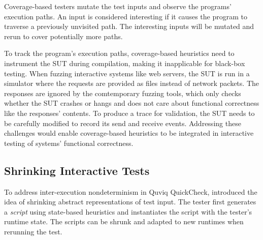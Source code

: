 Coverage-based testers mutate the test inputs and observe the programs'
execution paths.  An input is considered interesting if it causes the program to
traverse a previously unvisited path.  The interesting inputs will be mutated
and rerun to cover potentially more paths.

To track the program's execution paths, coverage-based heuristics need to
instrument the SUT during compilation, making it inapplicable for black-box
testing.  When fuzzing interactive systems like web servers, the SUT is run in a
simulator where the requests are provided as files instead of network packets.
The responses are ignored by the comtemporary fuzzing tools, which only checks
whether the SUT crashes or hangs and does not care about functional correctness
like the responses' contents.  To produce a trace for validation, the SUT needs
to be carefully modified to record its send and receive events.  Addressing
these challenges would enable coverage-based heuristics to be integrated in
interactive testing of systems' functional correctness.

\subsection{Shrinking Interactive Tests}
\label{sec:related-shrink}

To address inter-execution nondeterminism in Quviq QuickCheck,
\citet{Hughes2016} introduced the idea of shrinking abstract representations of
test input.  The tester first generates a {\em script} using state-based
heuristics and instantiates the script with the tester's runtime state.  The
scripts can be shrunk and adapted to new runtimes when rerunning the test.

